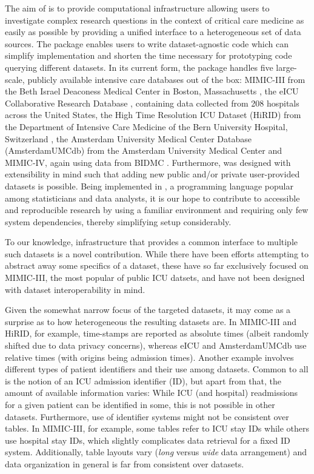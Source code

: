 \documentclass[
  notitle,
  nojss,
  noheadings]{jss}
\begin{document}
The aim of  is to provide computational infrastructure
allowing users to investigate complex research questions in the context
of critical care medicine as easily as possible by providing a unified
interface to a heterogeneous set of data sources. The package enables
users to write dataset-agnostic code which can simplify implementation
and shorten the time necessary for prototyping code querying different
datasets. In its current form, the package handles five large-scale,
publicly available intensive care databases out of the box: MIMIC-III
from the Beth Israel Deaconess Medical Center in Boston, Massachusetts
\citep[BIDMC;][]{johnson2016}, the eICU Collaborative Research Database
\citep{pollard2018}, containing data collected from 208 hospitals across
the United States, the High Time Resolution ICU Dataset (HiRID) from the
Department of Intensive Care Medicine of the Bern University Hospital,
Switzerland \citep{faltys2021}, the Amsterdam University Medical Center
Database (AmsterdamUMCdb) from the Amsterdam University Medical Center
\citep{thoral2021} and MIMIC-IV, again using data from BIDMC
\citep{johnson2021}. Furthermore,  was designed with
extensibility in mind such that adding new public and/or private
user-provided datasets is possible. Being implemented in , a
programming language popular among statisticians and data analysts, it
is our hope to contribute to accessible and reproducible research by
using a familiar environment and requiring only few system dependencies,
thereby simplifying setup considerably.

To our knowledge, infrastructure that provides a common interface to
multiple such datasets is a novel contribution. While there have been
efforts \citep{adibuzzaman2016, wang2020} attempting to abstract away
some specifics of a dataset, these have so far exclusively focused on
MIMIC-III, the most popular of public ICU datsets, and have not been
designed with dataset interoperability in mind.

Given the somewhat narrow focus of the targeted datasets, it may come as
a surprise as to how heterogeneous the resulting datasets are. In
MIMIC-III and HiRID, for example, time-stamps are reported as absolute
times (albeit randomly shifted due to data privacy concerns), whereas
eICU and AmsterdamUMCdb use relative times (with origins being admission
times). Another example involves different types of patient identifiers
and their use among datasets. Common to all is the notion of an ICU
admission identifier (ID), but apart from that, the amount of available
information varies: While ICU (and hospital) readmissions for a given
patient can be identified in some, this is not possible in other
datasets. Furthermore, use of identifier systems might not be consistent
over tables. In MIMIC-III, for example, some tables refer to ICU stay
IDs while others use hospital stay IDs, which slightly complicates data
retrieval for a fixed ID system. Additionally, table layouts vary
(\emph{long} versus \emph{wide} data arrangement) and data organization
in general is far from consistent over datasets.
\end{document}
